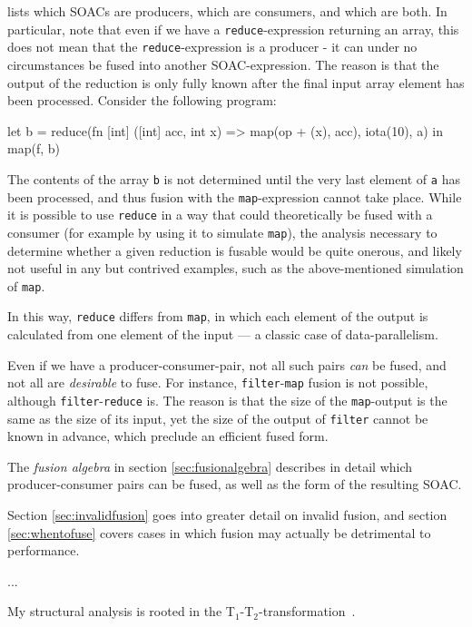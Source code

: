  lists which \LO{} SOACs are producers,
which are consumers, and which are both.  In particular, note that
even if we have a \texttt{reduce}-expression returning an array, this
does not mean that the \texttt{reduce}-expression is a producer - it
can under no circumstances be fused into another SOAC-expression.  The
reason is that the output of the reduction is only fully known after
the final input array element has been processed.  Consider the
following program:

\begin{colorcode}
let b = reduce(fn [int] ([int] acc, int x) =>
                 map(op + (x), acc),
               iota(10), a) in
map(f, b)
\end{colorcode}

The contents of the array \texttt{b} is not determined until the very
last element of \texttt{a} has been processed, and thus fusion with
the \texttt{map}-expression cannot take place.  While it is possible
to use \texttt{reduce} in a way that could theoretically be fused with
a consumer (for example by using it to simulate \texttt{map}), the
analysis necessary to determine whether a given reduction is fusable
would be quite onerous, and likely not useful in any but contrived
examples, such as the above-mentioned simulation of \texttt{map}.

In this way, \texttt{reduce} differs from \texttt{map}, in which each
element of the output is calculated from one element of the input ---
a classic case of data-parallelism.

Even if we have a producer-consumer-pair, not all such pairs
\textit{can} be fused, and not all are \textit{desirable} to fuse.
For instance, \texttt{filter}-\texttt{map} fusion is not possible,
although \texttt{filter}-\texttt{reduce} is.  The reason is that the
size of the \texttt{map}-output is the same as the size of its input,
yet the size of the output of \texttt{filter} cannot be known in
advance, which preclude an efficient fused form.

The \textit{fusion algebra} in section \ref{sec:fusionalgebra}
describes in detail which producer-consumer pairs can be fused, as
well as the form of the resulting SOAC.

Section \ref{sec:invalidfusion} goes into greater detail on invalid
fusion, and section \ref{sec:whentofuse} covers cases in which fusion
may actually be detrimental to performance.

...

My structural analysis is rooted in the
T$_{1}$-T$_{2}$-transformation~\cite{red_dragon}.


